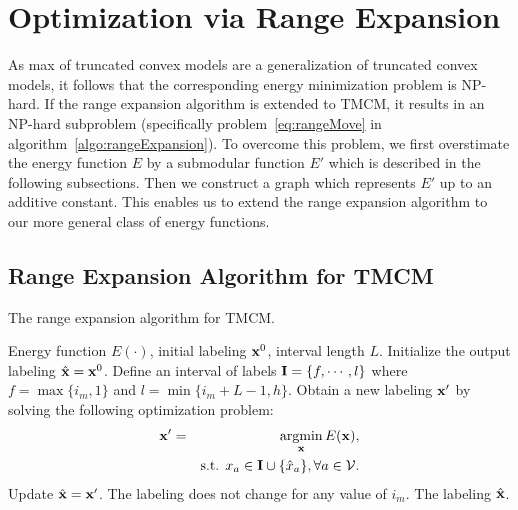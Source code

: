 \documentclass[10pt,letterpaper]{article}
\newcommand{\argmin}{\operatornamewithlimits{argmin}}
\begin{document}
\section{Optimization via Range Expansion}
As max of truncated convex models are a generalization of truncated convex models, it follows that the corresponding energy
minimization problem is NP-hard. If the range expansion algorithm is extended to TMCM, it results in an NP-hard subproblem (specifically problem~\ref{eq:rangeMove} in algorithm~\ref{algo:rangeExpansion}). To overcome this problem, we first overstimate the energy function ${E}$ by a submodular function ${E'}$ which is described in the following subsections. Then we construct a graph which represents ${E'}$ up to an additive constant. This enables us to extend the range expansion algorithm to our more general class
of energy functions.

\subsection{Range Expansion Algorithm for TMCM}

\begin{algorithm}
\small
\caption{The range expansion algorithm for TMCM.}
\begin{algorithmic}[1]
\INPUT Energy function $E(\cdot)$, initial labeling ${\bf x}^0$, interval length $L$.
\STATE Initialize the output labeling $\hat{\bf x} = {\bf x}^0$.
\REPEAT
{}
\STATE Define an interval of labels ${\bf I} = \{f,\cdots,l\}$ where $f = \max\{i_m,1\}$ and
$l = \min\{i_m+L-1,h\}$.
\STATE Obtain a new labeling ${\bf x}'$ by solving the following optimization problem:
\begin{eqnarray}
{\bf x}' = && \argmin_{\bf x} E({\bf x}), \nonumber \\
&& \mbox{s.t. } x_a \in {\bf I} \cup \{\hat{x}_a\}, \forall a \in {\cal V}.
\label{eq:rangeMove}
\end{eqnarray}
\STATE Update $\hat{\bf x} = {\bf x}'$.
\ENDIF
\ENDFOR
\UNTIL The labeling does not change for any value of $i_m$.
\OUTPUT The labeling $\hat{\bf x}$.
\end{algorithmic}
\label{algo:rangeExpansion}
\end{algorithm}
\end{document}

